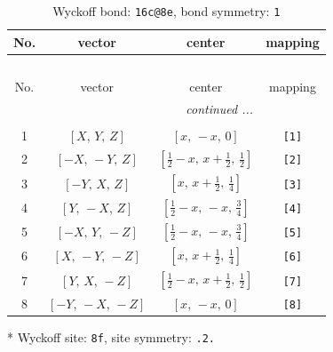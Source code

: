 \documentclass[fleqn,8pt]{jsarticle}
\begin{document}
\renewcommand{\arraystretch}{1.2}
\begin{longtable}{cccc}
\caption{Wyckoff bond: {\tt 16c@8e}, bond symmetry: {\tt 1}}
 \\
 \hline \hline
No. & vector & center & mapping \\ \hline \endfirsthead

\multicolumn{3}{l}{\tablename\ \thetable{}} \\
 \hline \hline
No. & vector & center & mapping \\ \hline \endhead

 \hline \hline
\multicolumn{3}{r}{\footnotesize\it continued ...} \\ \endfoot

 \hline \hline
\multicolumn{3}{r}{} \\ \endlastfoot

1 & $\left[ X,\, Y,\, Z \right]$ & $\left[ x,\, - x,\, 0 \right]$ & {\tt [1]} \\ \hline
2 & $\left[ - X,\, - Y,\, Z \right]$ & $\left[ \frac{1}{2} - x,\, x + \frac{1}{2},\, \frac{1}{2} \right]$ & {\tt [2]} \\ \hline
3 & $\left[ - Y,\, X,\, Z \right]$ & $\left[ x,\, x + \frac{1}{2},\, \frac{1}{4} \right]$ & {\tt [3]} \\ \hline
4 & $\left[ Y,\, - X,\, Z \right]$ & $\left[ \frac{1}{2} - x,\, - x,\, \frac{3}{4} \right]$ & {\tt [4]} \\ \hline
5 & $\left[ - X,\, Y,\, - Z \right]$ & $\left[ \frac{1}{2} - x,\, - x,\, \frac{3}{4} \right]$ & {\tt [5]} \\ \hline
6 & $\left[ X,\, - Y,\, - Z \right]$ & $\left[ x,\, x + \frac{1}{2},\, \frac{1}{4} \right]$ & {\tt [6]} \\ \hline
7 & $\left[ Y,\, X,\, - Z \right]$ & $\left[ \frac{1}{2} - x,\, x + \frac{1}{2},\, \frac{1}{2} \right]$ & {\tt [7]} \\ \hline
8 & $\left[ - Y,\, - X,\, - Z \right]$ & $\left[ x,\, - x,\, 0 \right]$ & {\tt [8]} \\
\end{longtable}
* Wyckoff site: {\tt 8f}, site symmetry: {\tt .2.}
\renewcommand{\arraystretch}{1.2}
\end{document}
